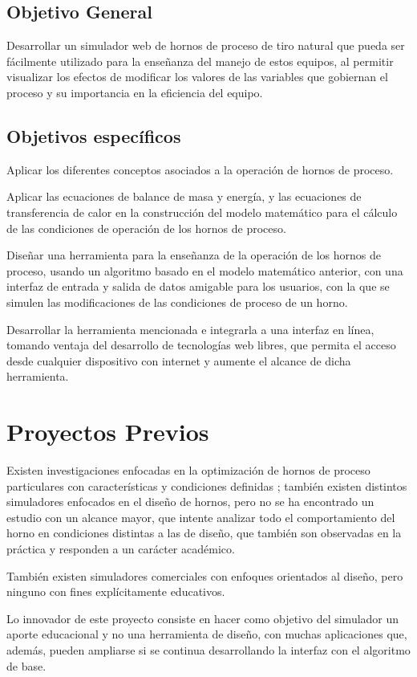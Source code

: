 \subsection{Objetivo General}
\par Desarrollar un simulador web de hornos de proceso de tiro natural que pueda ser fácilmente utilizado para la enseñanza del manejo de estos equipos, al permitir visualizar los efectos de modificar los valores de las variables que gobiernan el proceso y su importancia en la eficiencia del equipo.

\subsection{Objetivos específicos}
\par Aplicar los diferentes conceptos asociados a la operación de hornos de proceso.
\par Aplicar las ecuaciones de balance de masa y energía, y las ecuaciones de transferencia de calor en la construcción del modelo matemático para el cálculo de las condiciones de operación de los hornos de proceso.
\par Diseñar una herramienta para la enseñanza de la operación de los hornos de proceso, usando un algoritmo basado en el modelo matemático anterior, con una interfaz de entrada y salida de datos amigable para los usuarios, con la que se simulen las modificaciones de las condiciones de proceso de un horno.
\par Desarrollar la herramienta mencionada e integrarla a una interfaz en línea, tomando ventaja del desarrollo de tecnologías web libres, que permita el acceso desde cualquier dispositivo con internet y aumente el alcance de dicha herramienta.

\section{Proyectos Previos}

\par Existen investigaciones enfocadas en la optimización de hornos de proceso particulares con características y condiciones definidas \cite{bib:leti}; también existen distintos simuladores enfocados en el diseño de hornos, pero no se ha encontrado un estudio con un alcance mayor, que intente analizar todo el comportamiento del horno en condiciones distintas a las de diseño, que también son observadas en la práctica y responden a un carácter académico.
\par También existen simuladores comerciales con enfoques orientados al diseño, pero ninguno con fines explícitamente educativos.
\par Lo innovador de este proyecto consiste en hacer como objetivo del simulador un aporte educacional y no una herramienta de diseño, con muchas aplicaciones que, además, pueden ampliarse si se continua desarrollando la interfaz con el algoritmo de base.